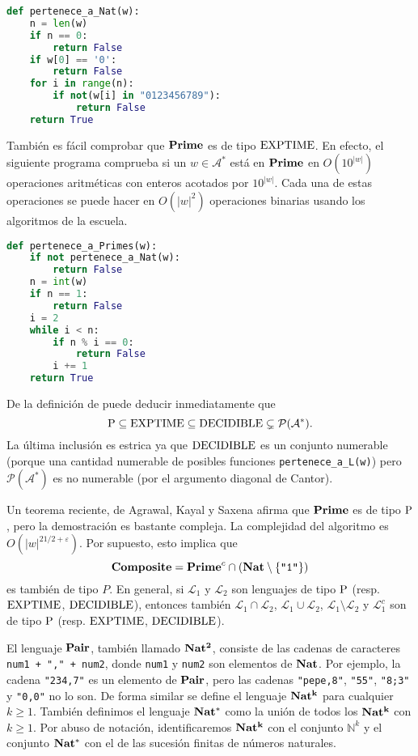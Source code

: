 \documentclass[a4paper, 11pt]{article}
\newcommand{\Alf}{\mathcal{A}}
\newcommand{\Lan}{\mathcal{L}}
\newcommand{\NN}{\mathbb{N}}
\theoremstyle{plain}
\theoremstyle{definition}
\begin{document}
\begin{lstlisting}[language=Python,morekeywords={as,assert,nonlocal,with,yield}]
def pertenece_a_Nat(w):
    n = len(w)
    if n == 0:
        return False
    if w[0] == '0':
        return False
    for i in range(n):
        if not(w[i] in "0123456789"):
            return False
    return True
\end{lstlisting}

\bigskip

También es fácil comprobar que ${\bf Prime}$ es de tipo ${\rm EXPTIME}$. En efecto, el
siguiente programa comprueba si un $w\in\Alf^*$ está en ${\bf Prime}$ en $O(10^{|w|})$
operaciones aritméticas con enteros acotados por $10^{|w|}$. Cada una de estas operaciones
se puede hacer en $O(|w|^2)$ operaciones binarias usando los algoritmos de la escuela.

\begin{lstlisting}[language=Python,morekeywords={as,assert,nonlocal,with,yield}]
def pertenece_a_Primes(w):
    if not pertenece_a_Nat(w):
        return False
    n = int(w)
    if n == 1:
        return False
    i = 2
    while i < n:
        if n % i == 0:
            return False
        i += 1
    return True
\end{lstlisting}

\bigskip

De la definición de puede deducir inmediatamente que
\[
  {\rm P}\subseteq{\rm EXPTIME}\subseteq{\rm DECIDIBLE}\subsetneq\mathcal{P}(\Alf^*).
\]
La última inclusión es estrica ya que ${\rm DECIDIBLE}$ es un conjunto numerable (porque
una cantidad numerable de posibles funciones \texttt{pertenece\_a\_L(w)}) pero
$\mathcal{P}(\Alf^*)$ es no numerable (por el argumento diagonal de Cantor).

\bigskip

Un teorema reciente, de Agrawal, Kayal y Saxena afirma que ${\bf Prime}$ es de tipo
${\rm P}$, pero la demostración es bastante compleja. La complejidad del algoritmo
es $O(|w|^{21/2+\varepsilon})$. Por supuesto, esto implica que \[{\bf Composite}=
{\bf Prime}^c\cap({\bf Nat}\setminus\{\texttt{"1"}\})\] es también de tipo $P$.
En general, si $\Lan_1$ y $\Lan_2$ son lenguajes de tipo ${\rm P}$ (resp. ${\rm EXPTIME}$,
${\rm DECIDIBLE}$), entonces también $\Lan_1\cap\Lan_2$, $\Lan_1\cup\Lan_2$,
$\Lan_1\setminus\Lan_2$ y $\Lan_1^c$ son de tipo ${\rm P}$ (resp. ${\rm EXPTIME}$,
${\rm DECIDIBLE}$).

\bigskip

El lenguaje ${\bf Pair}$, también llamado ${\bf Nat^2}$, consiste de las cadenas
de caracteres \texttt{num1 + "," + num2}, donde \texttt{num1} y \texttt{num2} son
elementos de ${\bf Nat}$. Por ejemplo, la cadena \texttt{"234,7"}
es un elemento de ${\bf Pair}$, pero las cadenas \texttt{"pepe,8"}, \texttt{"55"},
\texttt{"8;3"} y \texttt{"0,0"} no lo son. De forma similar se define el lenguaje
${\bf Nat^k}$ para cualquier $k\geq 1$. También definimos el lenguaje ${\bf Nat^*}$
como la unión de todos los ${\bf Nat^k}$ con $k\geq 1$. Por abuso de notación,
identificaremos ${\bf Nat^k}$ con el conjunto $\NN^k$ y el conjunto ${\bf Nat^*}$
con el de las sucesión finitas de números naturales.
\end{document}
